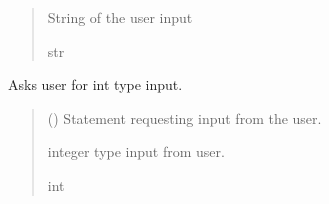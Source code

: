 \documentclass[letterpaper,10pt,english]{sphinxmanual}
\begin{document}
\begin{fulllineitems}
\begin{fulllineitems}
\begin{quote}
\begin{description}
\begin{itemize}
\end{itemize}

\sphinxAtStartPar
String of the user input

\sphinxAtStartPar
str

\end{description}\end{quote}

\end{fulllineitems}


\begin{fulllineitems}
\label{\detokenize{GetUserInput:GetUserInput.UserInput.AskForInt}}
\pysigstartsignatures
{}
\pysigstopsignatures
\sphinxAtStartPar
Asks user for int type input.
\begin{quote}\begin{description}
\sphinxAtStartPar
{} () \textendash{} Statement requesting input from the user.

\sphinxAtStartPar
integer type input from user.

\sphinxAtStartPar
int

\end{description}\end{quote}

\end{fulllineitems}



\end{fulllineitems}
\end{document}
